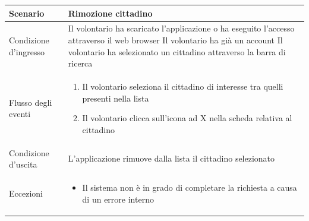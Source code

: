 \documentclass[12pt,a4paper,twoside,openright,titlepage]{book}
\begin{document}
\begin{table}[H]
\centering
\begin{tabular}{|p{4cm}|p{10cm}|}
\hline
Scenario & Rimozione cittadino \\
\hline
Condizione d'ingresso & Il volontario ha scaricato l'applicazione o ha eseguito l'accesso attraverso il web browser \newline
Il volontario ha già un account\newline
Il volontario ha selezionato un cittadino attraverso la barra di ricerca\\
\hline
Flusso degli eventi & 
\begin{enumerate}
\item Il volontario seleziona il cittadino di interesse tra quelli presenti nella lista
\item Il volontario clicca sull'icona ad X nella scheda relativa al cittadino
\end{enumerate}\\
\hline
Condizione d'uscita & L'applicazione rimuove dalla lista il cittadino selezionato\\
\hline
Eccezioni & 
\begin{itemize}
\item Il sistema non è in grado di completare la richiesta a causa di un errore interno
\end{itemize} \\
\hline
\end{tabular}
\end{table}
\end{document}
